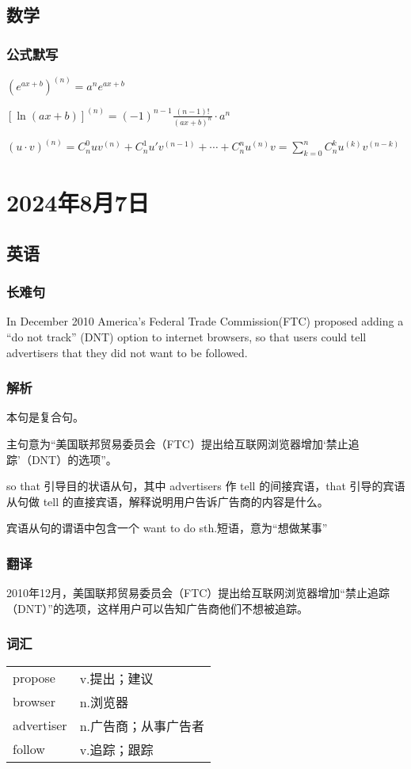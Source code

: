 \documentclass[UTF8]{ctexart}
\begin{document}
\subsection{数学}
\subsubsection{公式默写}
\begin{multicols}{2}
      $(e^{ax+b})^{(n)}=a^ne^{ax+b}$

      $[\ln(ax+b)]^{(n)}=(-1)^{n-1}\frac{(n-1)!}{(ax+b)^n}\cdot a^n$
\end{multicols}
$(u\cdot v)^{(n)}=C_n^0uv^{(n)}+C_n^1u'v^{(n-1)}+\cdots+C_n^nu^{(n)}v=\sum\limits_{k=0}^{n}C_n^ku^{(k)}v^{(n-k)}$
\section{2024年8月7日}
\subsection{英语}
\subsubsection{长难句}
In December 2010 America's Federal Trade Commission(FTC) proposed adding a ``do not track'' (DNT) option to internet browsers, so that users could tell advertisers that they did not want to be followed.
\subsubsection{解析}
本句是复合句。

主句意为“美国联邦贸易委员会（FTC）提出给互联网浏览器增加‘禁止追踪’（DNT）的选项”。

so that 引导目的状语从句，其中 advertisers 作 tell 的间接宾语，that 引导的宾语从句做 tell 的直接宾语，解释说明用户告诉广告商的内容是什么。

宾语从句的谓语中包含一个 want to do sth.短语，意为“想做某事”
\subsubsection{翻译}
2010年12月，美国联邦贸易委员会（FTC）提出给互联网浏览器增加“禁止追踪（DNT）”的选项，这样用户可以告知广告商他们不想被追踪。
\subsubsection{词汇}
\begin{table}[h]
      \centering
      \begin{tabular}{p{}p{}}
            propose    & v.提出；建议     \\
            browser    & n.浏览器       \\
            advertiser & n.广告商；从事广告者 \\
            follow     & v.追踪；跟踪
      \end{tabular}
\end{table}
\end{document}
